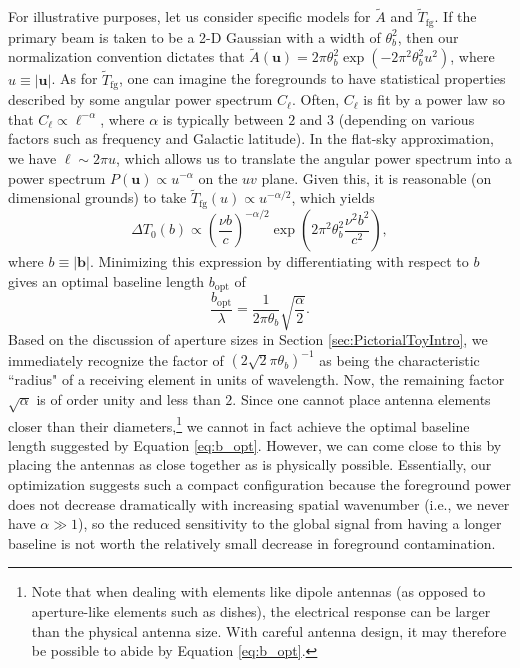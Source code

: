 \documentclass[twocolumn,apj,numberedappendix]{emulateapj}
\newcommand{\acl}[1]{}
\begin{document}
For illustrative purposes, let us consider specific models for $\widetilde{A}$ and $\widetilde{T}_\textrm{fg}$.  If the primary beam is taken to be a 2-D Gaussian with a width of $\theta_b^2$, then our normalization convention dictates that $\widetilde{A}(\mathbf{u}) = 2 \pi \theta_b^2 \exp (-2 \pi^2 \theta_b^2 u^2 )$, where $u \equiv |\mathbf{u}|$.  As for $\widetilde{T}_\textrm{fg}$, one can imagine the foregrounds to have statistical properties described by some angular power spectrum $C_\ell$.  Often, $C_\ell$ is fit by a power law so that $C_\ell \propto \ell^{-\alpha}$, where $\alpha$ is typically between $2$ and $3$ (depending on various factors such as frequency and Galactic latitude).  In the flat-sky approximation, we have $\ell \sim 2 \pi u$, which allows us to translate the angular power spectrum into a power spectrum $P(\mathbf{u}) \propto u^{-\alpha}$ on the $uv$ plane.  Given this, it is reasonable (on dimensional grounds) to take $\widetilde{T}_\textrm{fg} (u)\propto u^{-\alpha/2}$, which yields
\begin{equation}
\label{eq:DeviationPowGauss}
\Delta T_0(b) \propto \left( \frac{\nu b}{c}\right)^{-\alpha/2} \exp \left(2 \pi^2 \theta_b^2 \frac{\nu^2 b^2}{c^2}  \right),
\end{equation}
where $b \equiv | \mathbf{b} |$.  Minimizing this expression by differentiating with respect to $b$ gives an optimal baseline length $b_\textrm{opt}$ of
\begin{equation}
\label{eq:b_opt}
\frac{b_\textrm{opt}}{\lambda} = \frac{1}{2\pi \theta_b} \sqrt{\frac{\alpha}{2}}.
\end{equation}
Based on the discussion of aperture sizes in Section \ref{sec:PictorialToyIntro}, we immediately
recognize the factor of $(2 \sqrt{2} \pi \theta_b)^{-1}$ as being the characteristic ``radius" of a receiving element in units of wavelength. Now, the remaining factor $\sqrt{\alpha}$ is of order unity and less than
$2$. Since one cannot place antenna elements closer than their diameters,\footnote{Note that
when dealing with elements like dipole antennas (as opposed to aperture-like elements such as dishes), the electrical response can be larger than the physical antenna size. With careful antenna design, it may therefore be possible to abide by Equation \eqref{eq:b_opt}. \acl{Just a marker to remind myself that I added this, and changed the text surrounding the footnote.}} we cannot in fact
achieve the optimal baseline length suggested by Equation \eqref{eq:b_opt}. However, we can
come close to this by placing the antennas as close together as is physically possible. Essentially, our
optimization suggests such a compact configuration because the foreground power does not decrease
dramatically with increasing spatial wavenumber (i.e., we never have $\alpha \gg 1$), so the reduced sensitivity to the global signal from having a longer baseline is not worth the relatively small decrease in foreground contamination.
\end{document}
